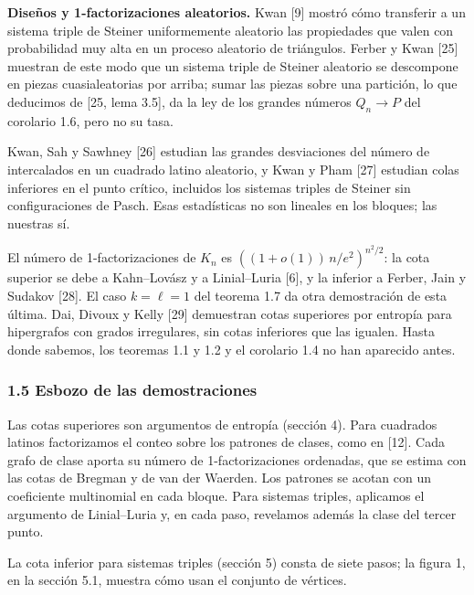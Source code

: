 \documentclass[spanish,11pt,a4paper]{article}
\begin{document}
\textbf{Diseños y 1-factorizaciones aleatorios.} Kwan {[}9{]} mostró cómo transferir a un sistema triple de Steiner uniformemente aleatorio las propiedades que valen con probabilidad muy alta en un proceso aleatorio de triángulos. Ferber y Kwan {[}25{]} muestran de este modo que un sistema triple de Steiner aleatorio se descompone en piezas cuasialeatorias por arriba; sumar las piezas sobre una partición, lo que deducimos de {[}25, lema 3.5{]}, da la ley de los grandes números \(Q_n\to P\) del corolario 1.6, pero no su tasa.

Kwan, Sah y Sawhney {[}26{]} estudian las grandes desviaciones del número de intercalados en un cuadrado latino aleatorio, y Kwan y Pham {[}27{]} estudian colas inferiores en el punto crítico, incluidos los sistemas triples de Steiner sin configuraciones de Pasch. Esas estadísticas no son lineales en los bloques; las nuestras sí.

El número de 1-factorizaciones de \(K_n\) es \(((1+o(1))\,n/e^2)^{n^2/2}\): la cota superior se debe a Kahn--Lovász y a Linial--Luria {[}6{]}, y la inferior a Ferber, Jain y Sudakov {[}28{]}. El caso \(k=\ell=1\) del teorema 1.7 da otra demostración de esta última. Dai, Divoux y Kelly {[}29{]} demuestran cotas superiores por entropía para hipergrafos con grados irregulares, sin cotas inferiores que las igualen. Hasta donde sabemos, los teoremas 1.1 y 1.2 y el corolario 1.4 no han aparecido antes.

\subsubsection{1.5 Esbozo de las demostraciones}\label{esbozo-de-las-demostraciones}

Las cotas superiores son argumentos de entropía (sección 4). Para cuadrados latinos factorizamos el conteo sobre los patrones de clases, como en {[}12{]}. Cada grafo de clase aporta su número de 1-factorizaciones ordenadas, que se estima con las cotas de Bregman y de van der Waerden. Los patrones se acotan con un coeficiente multinomial en cada bloque. Para sistemas triples, aplicamos el argumento de Linial--Luria y, en cada paso, revelamos además la clase del tercer punto.

La cota inferior para sistemas triples (sección 5) consta de siete pasos; la figura 1, en la sección 5.1, muestra cómo usan el conjunto de vértices.
\end{document}
